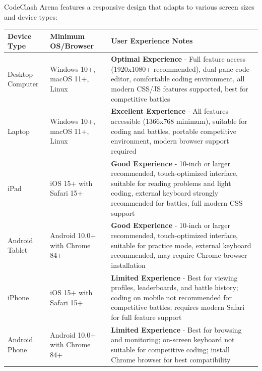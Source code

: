 \documentclass[12pt,a4paper]{article}
\begin{document}
CodeClash Arena features a responsive design that adapts to various screen sizes and device types:

\begin{longtable}{|p{3cm}|p{3cm}|p{7.5cm}|}
\hline
\textbf{Device Type} & \textbf{Minimum OS/Browser} & \textbf{User Experience Notes} \\
\hline
\endhead

Desktop Computer & Windows 10+, macOS 11+, Linux & \textbf{Optimal Experience} - Full feature access (1920x1080+ recommended), dual-pane code editor, comfortable coding environment, all modern CSS/JS features supported, best for competitive battles \\
\hline

Laptop & Windows 10+, macOS 11+, Linux & \textbf{Excellent Experience} - All features accessible (1366x768 minimum), suitable for coding and battles, portable competitive environment, modern browser support required \\
\hline

iPad & iOS 15+ with Safari 15+ & \textbf{Good Experience} - 10-inch or larger recommended, touch-optimized interface, suitable for reading problems and light coding, external keyboard strongly recommended for battles, full modern CSS support \\
\hline

Android Tablet & Android 10.0+ with Chrome 84+ & \textbf{Good Experience} - 10-inch or larger recommended, touch-optimized interface, suitable for practice mode, external keyboard recommended, may require Chrome browser installation \\
\hline

iPhone & iOS 15+ with Safari 15+ & \textbf{Limited Experience} - Best for viewing profiles, leaderboards, and battle history; coding on mobile not recommended for competitive battles; requires modern Safari for full feature support \\
\hline

Android Phone & Android 10.0+ with Chrome 84+ & \textbf{Limited Experience} - Best for browsing and monitoring; on-screen keyboard not suitable for competitive coding; install Chrome browser for best compatibility \\
\hline

\end{longtable}
\end{document}
